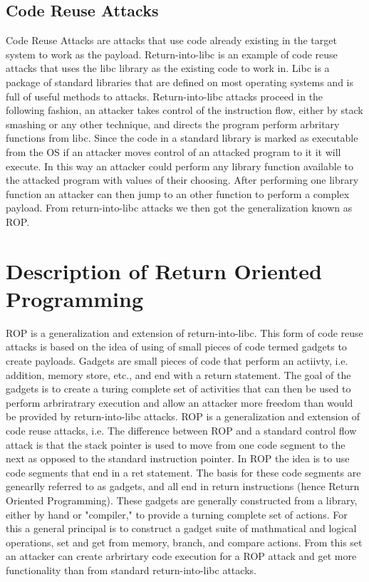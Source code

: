 \documentclass[11pt]{amsart}
\begin{document}
\subsection*{Code Reuse Attacks}
Code Reuse Attacks are attacks that use code already existing in the target system to work as the payload. Return-into-libc is an example of code reuse attacks that uses the libc library as the existing code to work in. Libc is a package of standard libraries that are defined on most operating systems and is full of useful methods to attacks. Return-into-libc attacks proceed in the following fashion, an attacker takes control of the instruction flow, either by stack smashing or any other technique, and directs the program perform arbritary functions from libc. Since the code in a standard library is marked as executable from the OS if an attacker moves control of an attacked program to it it will execute. In this way an attacker could perform any library function available to the attacked program with values of their choosing. After performing one library function an attacker can then jump to an other function to perform a complex payload.  From return-into-libc attacks we then got the generalization known as ROP.
\section*{Description of Return Oriented Programming}
ROP is a generalization and extension of return-into-libc. This form of code reuse attacks is based on the idea of using of small pieces of code termed gadgets to create payloads. Gadgets are small pieces of code that perform an actiivty, i.e. addition, memory store, etc., and end with a return statement. The goal of the gadgets is to create a turing complete set of activities that can then be used to perform arbriratrary execution and allow an attacker more freedom than would be provided by return-into-libc attacks. ROP is a generalization and extension of code reuse attacks, i.e. The difference between ROP and a standard control flow attack is that the stack pointer is used to move from one code segment to the next as opposed to the standard instruction pointer. In ROP the idea is to use code segments that end in a ret statement.\newline
The basis for these code segments are genearlly referred to as gadgets, and all end in return instructions (hence Return Oriented Programming). These gadgets are generally constructed from a library, either by hand or "compiler," to provide a turning complete set of actions. For this a general principal is to construct a gadget suite of mathmatical and logical operations, set and get from memory, branch, and compare actions. From this set an attacker can create arbrirtary code execution for a ROP attack and get more functionality than from standard return-into-libc attacks.
\end{document}
